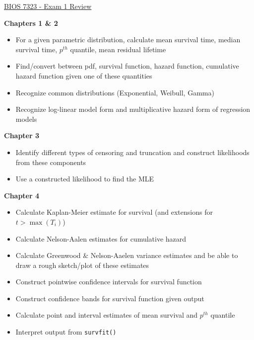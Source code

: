 \documentclass[11pt]{article}
\begin{document}
\underline{BIOS 7323 - Exam 1 Review}

\textbf{Chapters 1 \& 2}
\begin{itemize}
	\item  For a given parametric distribution, calculate mean survival time, median survival time, $p^{th}$ quantile, mean residual lifetime 

	\item Find/convert between pdf, survival function, hazard function, cumulative hazard function given one of these quantities
	
	\item Recognize common distributions (Exponential, Weibull, Gamma)

	\item Recognize log-linear model form and multiplicative hazard form of regression models
\end{itemize}

\textbf{Chapter 3}
\begin{itemize}
\item Identify different types of censoring and truncation and construct likelihoods from these components

\item Use a constructed likelihood to find the MLE
\end{itemize}

\textbf{Chapter 4}
\begin{itemize}
\item Calculate Kaplan-Meier estimate for survival (and extensions for $t>\max(T_i)$)

\item Calculate Nelson-Aalen estimates for cumulative hazard

\item Calculate Greenwood \& Nelson-Aaelen variance estimates and be able to draw a rough sketch/plot of these estimates

\item Construct pointwise confidence intervals for survival function 

\item Construct confidence bands for survival function given output 

\item Calculate point and interval estimates of mean survival and $p^{th}$ quantile 

\item Interpret output from \verb|survfit()|
\end{itemize}
\end{document}
